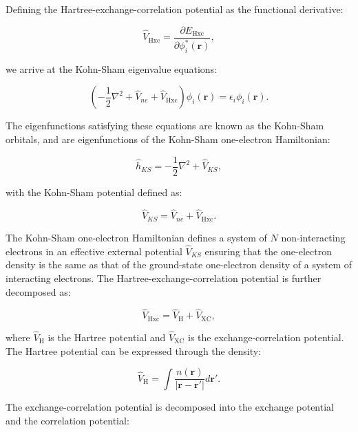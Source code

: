 Defining the Hartree-exchange-correlation potential as the functional
derivative:

\begin{equation}
 \hat{V}_{\text{Hxc}} = \frac{\partial E_{\text{Hxc}}}{\partial
    \phi_i^*(\bm{r})} ,
\end{equation}

we arrive at the Kohn-Sham eigenvalue equations:

\begin{equation}
 \left( -\frac{1}{2} \nabla^2 + \hat{V}_{ne} + \hat{V}_{\text{Hxc}}
    \right) \phi_i(\bm{r}) = \epsilon_i \phi_i (\bm{r}) .
\end{equation}

The eigenfunctions satisfying these equations are known as the
Kohn-Sham orbitals, and are eigenfunctions of the Kohn-Sham
one-electron Hamiltonian:

\begin{equation}
 \hat{h}_{KS} = - \frac{1}{2} \nabla^2 + \hat{V}_{KS} ,
\end{equation}

with the Kohn-Sham potential defined as:

\begin{equation}
 \hat{V}_{KS} = \hat{V}_{ne} + \hat{V}_{\text{Hxc}} .
\end{equation}

The Kohn-Sham one-electron Hamiltonian defines a system of $N$
non-interacting electrons in an effective external potential
$\hat{V}_{KS}$ ensuring that the one-electron density
is the same as that of the ground-state one-electron density
of a system of interacting electrons.
The Hartree-exchange-correlation potential is further
decomposed as:

\begin{equation}
\hat{V}_{\text{Hxc}} = \hat{V}_{\text{H}} + \hat{V}_{\text{XC}} ,
\end{equation}

where $\hat{V}_{\text{H}}$ is the Hartree potential and
$\hat{V}_{\text{XC}}$ is the exchange-correlation potential.
The Hartree potential can be expressed through the density:

\begin{equation}
\hat{V}_{\text{H}} = \int \frac{n(\bm{r})}{\left| \bm{r} -
    \bm{r}' \right|} d\bm{r}' .
\end{equation}

The exchange-correlation potential is decomposed
into the exchange potential and the correlation potential:

